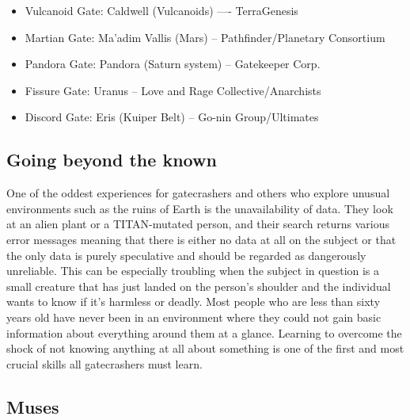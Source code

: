 \begin{itemize}
\item Vulcanoid Gate: Caldwell (Vulcanoids) —- TerraGenesis
\item Martian Gate: Ma’adim Vallis (Mars) -- Pathfinder/Planetary Consortium
\item Pandora Gate: Pandora (Saturn system) -- Gatekeeper Corp.
\item Fissure Gate: Uranus -- Love and Rage Collective/Anarchists
\item Discord Gate: Eris (Kuiper Belt) -- Go-nin Group/Ultimates
\end{itemize} 

\subsection{Going beyond the known}
\label{sec:going-beyond-known} 

One of the oddest experiences for gatecrashers and others who explore unusual environments such as the ruins of Earth is the unavailability of data. They look at an alien plant or a TITAN-mutated person, and their search returns various error messages meaning that there is either no data at all on the subject or that the only data is purely speculative and should be regarded as dangerously unreliable. This can be especially troubling when the subject in question is a small creature that has just landed on the person's shoulder and the individual wants to know if it's harmless or deadly. Most people who are less than sixty years old have never been in an environment where they could not gain basic information about everything around them at a glance. Learning to overcome the shock of not knowing anything at all about something is one of the first and most crucial skills all gatecrashers must learn. 

\subsection{Muses}
\label{sec:muses} 

